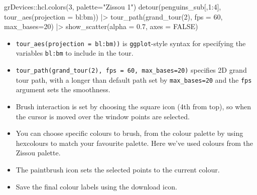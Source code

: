 \documentclass[
  letterpaper,
]{krantz}
\newenvironment{Shaded}{\begin{snugshade}}{\end{snugshade}}
\newcommand{\AttributeTok}[1]{\textcolor[rgb]{0.40,0.45,0.13}{#1}}
\newcommand{\ConstantTok}[1]{\textcolor[rgb]{0.56,0.35,0.01}{#1}}
\newcommand{\DecValTok}[1]{\textcolor[rgb]{0.68,0.00,0.00}{#1}}
\newcommand{\FloatTok}[1]{\textcolor[rgb]{0.68,0.00,0.00}{#1}}
\newcommand{\FunctionTok}[1]{\textcolor[rgb]{0.28,0.35,0.67}{#1}}
\newcommand{\NormalTok}[1]{\textcolor[rgb]{0.00,0.23,0.31}{#1}}
\newcommand{\SpecialCharTok}[1]{\textcolor[rgb]{0.37,0.37,0.37}{#1}}
\newcommand{\StringTok}[1]{\textcolor[rgb]{0.13,0.47,0.30}{#1}}
\providecommand{\tightlist}{%
  \setlength{\itemsep}{0pt}\setlength{\parskip}{0pt}}
\begin{document}
\begin{Shaded}
\begin{Highlighting}[]
\NormalTok{grDevices}\SpecialCharTok{::}\FunctionTok{hcl.colors}\NormalTok{(}\DecValTok{3}\NormalTok{, }\AttributeTok{palette=}\StringTok{"Zissou 1"}\NormalTok{)}
\FunctionTok{detour}\NormalTok{(penguins\_sub[,}\DecValTok{1}\SpecialCharTok{:}\DecValTok{4}\NormalTok{], }
       \FunctionTok{tour\_aes}\NormalTok{(}\AttributeTok{projection =}\NormalTok{ bl}\SpecialCharTok{:}\NormalTok{bm)) }\SpecialCharTok{|\textgreater{}}
       \FunctionTok{tour\_path}\NormalTok{(}\FunctionTok{grand\_tour}\NormalTok{(}\DecValTok{2}\NormalTok{), }\AttributeTok{fps =} \DecValTok{60}\NormalTok{, }
                 \AttributeTok{max\_bases=}\DecValTok{20}\NormalTok{) }\SpecialCharTok{|\textgreater{}}
       \FunctionTok{show\_scatter}\NormalTok{(}\AttributeTok{alpha =} \FloatTok{0.7}\NormalTok{, }
                    \AttributeTok{axes =} \ConstantTok{FALSE}\NormalTok{)}
\end{Highlighting}
\end{Shaded}

\begin{itemize}
\tightlist
\item
  \texttt{tour\_aes(projection\ =\ bl:bm))} is \texttt{ggplot}-style
  syntax for specifying the variables \texttt{bl:bm} to include in the
  tour.
\item
  \texttt{tour\_path(grand\_tour(2),\ fps\ =\ 60,\ max\_bases=20)}
  specifies 2D grand tour path, with a longer than default path set by
  \texttt{max\_bases=20} and the \texttt{fps} argument sets the
  smoothness.
\item
  Brush interaction is set by choosing the square icon (4th from top),
  so when the cursor is moved over the window points are selected.
\item
  You can choose specific colours to brush, from the colour palette by
  using hexcolours to match your favourite palette. Here we've used
  colours from the Zissou palette.
\item
  The paintbrush icon sets the selected points to the current colour.
\item
  Save the final colour labels using the download icon.
\end{itemize}
\end{document}
